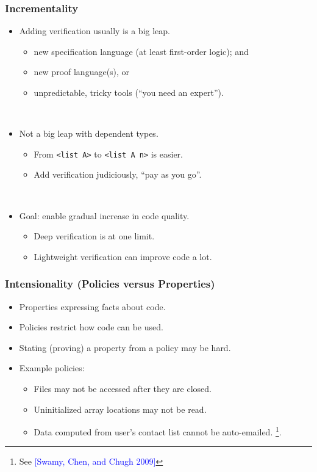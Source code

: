 \documentclass[10pt]{beamer}
\begin{document}
\begin{frame}
\frametitle{Incrementality}

\begin{itemize}
\item Adding verification usually is a big leap.
\begin{itemize}
\item new specification language (at least first-order logic); and
\item new proof language(s), or
\item unpredictable, tricky tools (``you need an expert'').
\end{itemize}

\ 

\item Not a big leap with dependent types.
\begin{itemize}
\item From \texttt{<list A>} to \texttt{<list A n>} is easier.
\item Add verification judiciously, ``pay as you go''.
\end{itemize}

\ 

\item Goal: enable gradual increase in code quality.
\begin{itemize}
\item Deep verification is at one limit.
\item Lightweight verification can improve code a lot.
\end{itemize}
\end{itemize}
\end{frame}

\begin{frame}
\frametitle{Intensionality (Policies versus Properties)}

\begin{itemize}
\item Properties expressing facts about code.
\item Policies restrict how code can be used.
\item Stating (proving) a property from a policy may be hard.
\item Example policies:
\begin{itemize}
\item Files may not be accessed after they are closed.
\item Uninitialized array locations may not be read.
\item Data computed from user's contact list cannot be auto-emailed. \footnote{See \textcolor{blue}{[Swamy, Chen, and Chugh 2009]}}.
\end{itemize}
\end{itemize}

\end{frame}
\end{document}
